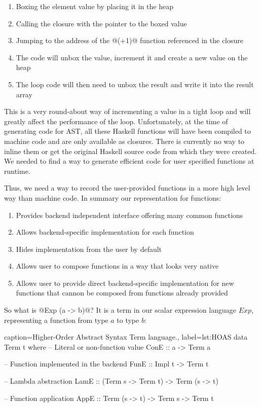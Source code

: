\documentclass[preamble.tex]{subfiles}
\begin{document}
\begin{enumerate}
\item Boxing the element value by placing it in the heap
\item Calling the closure with the pointer to the boxed value
\item Jumping to the address of the @(+1)@ function referenced in the closure
\item The code will unbox the value, increment it and create a new value on the heap
\item The loop code will then need to unbox the result and write it into the result array
\end{enumerate}

This is a very round-about way of incrementing a value in a tight loop and will greatly affect the performance of the loop. Unfortunately, at the time of generating code for AST, all these Haskell functions will have been compiled to machine code and are only available as closures. There is currently no way to inline them or get the original Haskell source code from which they were created. We needed to find a way to generate efficient code for user specified functions at runtime.

Thus, we need a way to record the user-provided functions in a more high level way than machine code. In summary our representation for functions:

\begin{enumerate}
\item Provides backend independent interface offering many common functions
\item Allows backend-specific implementation for each function
\item Hides implementation from the user by default
\item Allows user to compose functions in a way that looks very native
\item Allows user to provide direct backend-specific implementation for new functions that cannon be composed from functions already provided
\end{enumerate}


So what is @Exp (a -> b)@? It is a term in our scalar expression language $Exp$, representing a function from type $a$ to type $b$:

\begin{hscode2}{%
    caption={Higher-Order Abstract Syntax Term language.},%
    label=lst:HOAS}
data Term t where
  -- Literal or non-function value
  ConE :: a -> Term a

  -- Function implemented in the backend
  FunE :: Impl t -> Term t

  -- Lambda abstraction
  LamE :: (Term s -> Term t) -> Term (s -> t)

  -- Function application
  AppE :: Term (s -> t) -> Term s -> Term t
\end{hscode2}
\end{document}
